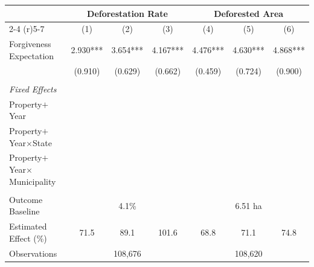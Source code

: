\documentclass[12pt]{article}
\begin{document}
 \begin{center}
 \begin{threeparttable}[b]
 \label{tab:3}
 \singlespacing
 \footnotesize
    	\caption{\textsc{Treatment Effects of Forgiveness Expectation}}
\setlength{\tabcolsep}{3pt}
\begin{tabular}{l*{6}c}  \midrule \midrule
& \multicolumn{3}{c}{\textbf{Deforestation Rate}} & \multicolumn{3}{c}{\textbf{Deforested Area}}  \\  \cmidrule(r){2-4} \cmidrule(r){5-7} 
  & (1) & (2) & (3) & (4) & (5) & (6)  \\
   \midrule
 Forgiveness Expectation & 2.930*** & 3.654*** & 4.167*** & 4.476*** & 4.630*** & 4.868*** \\  
& (0.910) & (0.629) & (0.662) & (0.459) & (0.724) & (0.900) \\ 
\\ \midrule
\textit{Fixed Effects} \\
\quad Property$+$Year & \cellcolor{green!50} & & & \cellcolor{green!50}\\
\quad Property$+$Year$\times$State & & \cellcolor{green!50} && & \cellcolor{green!50} \\
\quad Property$+$Year$\times$Municipality && & \cellcolor{green!50} && & \cellcolor{green!50} \\
& \\
Outcome Baseline & \multicolumn{3}{c}{4.1\%} & \multicolumn{3}{c}{6.51 ha} \\ 
Estimated Effect (\%) & 71.5 &	89.1 &	101.6 & 68.8 &	71.1 &	74.8   \\ 
Observations & \multicolumn{3}{c}{108,676} & \multicolumn{3}{c}{108,620} \\
   \midrule \midrule
	\end{tabular}
			\begin{tablenotes}[flushleft]

\end{tablenotes}
\end{threeparttable}
\end{center}
\end{document}
